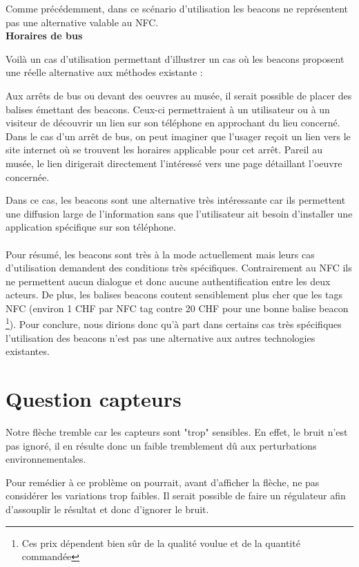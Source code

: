 \documentclass[12pt]{article}
\begin{document}
Comme précédemment, dans ce scénario d'utilisation les beacons ne représentent pas une alternative valable au NFC. \\

\textbf{Horaires de bus}
\medskip

Voilà un cas d'utilisation permettant d'illustrer un cas où les beacons proposent une réelle alternative aux méthodes existante : 

Aux arrêts de bus ou devant des oeuvres au musée, il serait possible de placer des balises émettant des beacons. Ceux-ci permettraient à un utilisateur ou à un visiteur de découvrir un lien sur son téléphone en approchant du lieu concerné. Dans le cas d'un arrêt de bus, on peut imaginer que l'usager reçoit un lien vers le site internet où se trouvent les horaires applicable pour cet arrêt. Pareil au musée, le lien dirigerait directement l'intéressé vers une page détaillant l'oeuvre concernée.

Dans ce cas, les beacons sont une alternative très intéressante car ils permettent une diffusion large de l'information sans que l'utilisateur ait besoin d'installer une application spécifique sur son téléphone. \\\\

Pour résumé, les beacons sont très à la mode actuellement mais leurs cas d'utilisation demandent des conditions très spécifiques. Contrairement au NFC ils ne permettent aucun dialogue et donc aucune authentification entre les deux acteurs. De plus, les balises beacons coutent sensiblement plus cher que les tags NFC (environ 1 CHF par NFC tag contre 20 CHF pour une bonne balise beacon \footnote{Ces prix dépendent bien sûr de la qualité voulue et de la quantité commandée}). 
Pour conclure, nous dirions donc qu'à part dans certains cas très spécifiques l'utilisation des beacons n'est pas une alternative aux autres technologies existantes.
\section*{Question capteurs}

Notre flèche tremble car les capteurs sont "trop" sensibles. En effet, le bruit n'est pas ignoré, il en résulte donc un faible tremblement dû aux perturbations environnementales.

Pour remédier à ce problème on pourrait, avant d'afficher la flèche, ne pas considérer les variations trop faibles. Il serait possible de faire un régulateur afin d'assouplir le résultat et donc d'ignorer le bruit.
\end{document}
